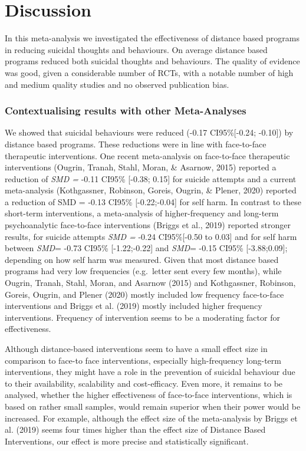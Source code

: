 \documentclass[
  english,
  man]{apa6}
\begin{document}
\hypertarget{discussion}{%
\section{Discussion}\label{discussion}}

In this meta-analysis we investigated the effectiveness of distance based programs in reducing suicidal thoughts and behaviours. On average distance based programs reduced both suicidal thoughts and behaviours. The quality of evidence was good, given a considerable number of RCTs, with a notable number of high and medium quality studies and no observed publication bias.

\hypertarget{contextualising-results-with-other-meta-analyses}{%
\subsubsection{Contextualising results with other Meta-Analyses}\label{contextualising-results-with-other-meta-analyses}}

We showed that suicidal behaviours were reduced (-0.17 CI95\%{[}-0.24; -0.10{]}) by distance based programs. These reductions were in line with face-to-face therapeutic interventions. One recent meta-analysis on face-to-face therapeutic interventions (Ougrin, Tranah, Stahl, Moran, \& Asarnow, 2015) reported a reduction of \emph{SMD =} -0.11 CI95\% {[}-0.38; 0.15{]} for suicide attempts and a current meta-analysis (Kothgassner, Robinson, Goreis, Ougrin, \& Plener, 2020) reported a reduction of SMD = -0.13 CI95\% {[}-0.22;-0.04{]} for self harm. In contrast to these short-term interventions, a meta-analysis of higher-frequency and long-term psychoanalytic face-to-face interventions (Briggs et al., 2019) reported stronger results, for suicide attempts \emph{SMD =} -0.24 CI95\%{[}-0.50 to 0.03{]} and for self harm between \emph{SMD}= -0.73 CI95\% {[}-1.22;-0.22{]} and \emph{SMD}= -0.15 CI95\% {[}-3.88;0.09{]}; depending on how self harm was measured. Given that most distance based programs had very low frequencies (e.g.~letter sent every few months), while Ougrin, Tranah, Stahl, Moran, and Asarnow (2015) and Kothgassner, Robinson, Goreis, Ougrin, and Plener (2020) mostly included low frequency face-to-face interventions and Briggs et al. (2019) mostly included higher frequency interventions. Frequency of intervention seems to be a moderating factor for effectiveness.

Although distance-based interventions seem to have a small effect size in comparison to face-to face interventions, especially high-frequency long-term interventions, they might have a role in the prevention of suicidal behaviour due to their availability, scalability and cost-efficacy. Even more, it remains to be analysed, whether the higher effectiveness of face-to-face interventions, which is based on rather small samples, would remain superior when their power would be increased. For example, although the effect size of the meta-analysis by Briggs et al. (2019) seems four times higher than the effect size of Distance Based Interventions, our effect is more precise and statistically significant.
\end{document}
